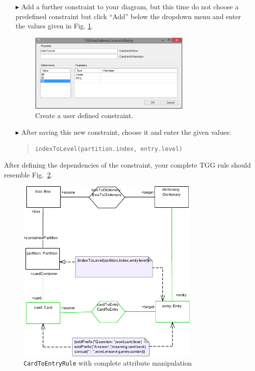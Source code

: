 \begin{enumerate}
\item[$\blacktriangleright$] Add a further constraint to your diagram, but this time do not choose a predefined constraint but click ``Add'' below the dropdown menu and enter the values given in Fig. \ref{fig:create_new_constraint}.

\begin{figure}[htbp]
\begin{center}
  \includegraphics[width=0.75\textwidth]{pics/tggBilder/tggRule/create_new_constraint}
  \caption{Create a user defined constraint.}
  \label{fig:create_new_constraint}
\end{center}
\end{figure}
\FloatBarrier

\item[$\blacktriangleright$] After saving this new constraint, choose it and enter the given values:

\begin{quotation}
\texttt{indexToLevel(partition.index, entry.level)}
\end{quotation}
\end{enumerate}

After defining the dependencies of the constraint, your complete TGG rule should resemble Fig.~\ref{fig:cardtoentry_complete}.
\begin{figure}[htbp]
\begin{center}
  \includegraphics[width=0.8\textwidth]{pics/tggBilder/tggRule/tgg21}
  \caption{\texttt{CardToEntryRule} with complete attribute manipulation}
  \label{fig:cardtoentry_complete}
\end{center}
\end{figure}

